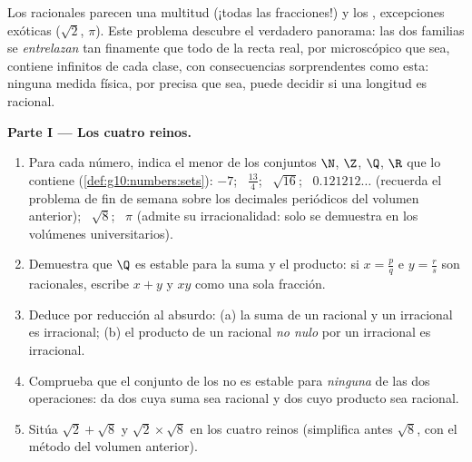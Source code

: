 \begin{problem}
\label{pb:g10:numbers:1}
Los racionales parecen una multitud (¡todas las fracciones!) y los
, excepciones exóticas ($\sqrt2$, $\pi$). Este problema
descubre el verdadero panorama: las dos familias se \emph{entrelazan} tan
finamente que todo  de la recta real, por microscópico que sea,
contiene infinitos de cada clase, con consecuencias sorprendentes como
esta: ninguna medida física, por precisa que sea, puede decidir si una
longitud es racional.

\medskip
\noindent\textbf{Parte I --- Los cuatro reinos.}
\begin{enumerate}
  \item Para cada número, indica el menor de los conjuntos $\N$, $\Z$,
        $\Q$, $\R$ que lo contiene
        (\cref{def:g10:numbers:sets}): $-7$; \ $\frac{13}{4}$; \
        $\sqrt{16}$; \ $0.121212\ldots$ (recuerda el problema de fin de
        semana sobre los decimales periódicos del volumen anterior); \
        $\sqrt8$; \ $\pi$ (admite su irracionalidad: solo se demuestra en
        los volúmenes universitarios).
  \item Demuestra que $\Q$ es estable para la suma y el producto: si
        $x = \frac pq$ e $y = \frac rs$ son racionales, escribe $x + y$ y
        $xy$ como una sola fracción.
  \item Deduce por reducción al absurdo: (a) la suma de un racional y un
        irracional es irracional; (b) el producto de un racional
        \emph{no nulo} por un irracional es irracional.
  \item Comprueba que el conjunto de los  no es estable para
        \emph{ninguna} de las dos operaciones: da dos  cuya
        suma sea racional y dos cuyo producto sea racional.
  \item Sitúa $\sqrt2 + \sqrt8$ y $\sqrt2 \times \sqrt8$ en los cuatro
        reinos (simplifica antes $\sqrt8$, con el método del volumen
        anterior).
\end{enumerate}


\end{problem}
